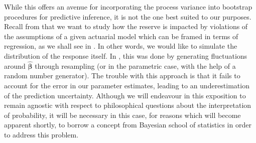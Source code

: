 \documentclass[a4paper]{book}
\begin{document}
While this offers an avenue for incorporating the process variance into bootstrap procedures for predictive inference, it is not the one best suited to our purposes. Recall from  that we want to study how the reserve is impacted by violations of the assumptions of a given actuarial model which can be framed in terms of regression, as we shall see in . In other words, we would like to simulate the distribution of the response itself. In , this was done by generating fluctuations around $\widehat{\bm{\beta}}$ through resampling (or in the parametric case, with the help of a random number generator). The trouble with this approach is that it fails to account for the error in our parameter estimates, leading to an underestimation of the prediction uncertainty. Although we will endeavour in this exposition to remain agnostic with respect to philosophical questions about the interpretation of probability, it will be necessary in this case, for reasons which will become apparent shortly, to borrow a concept from Bayesian school of statistics in order to address this problem.
\end{document}
